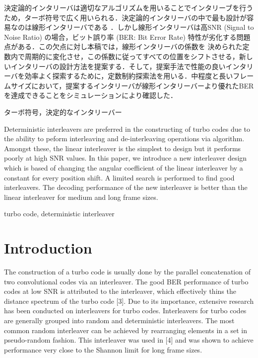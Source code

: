 \documentclass[technicalreport]{ieicej}
\begin{document}
\begin{jabstract}
決定論的インタリーバは適切なアルゴリズムを用いることでインタリーブを行うため，ターボ符号で広く用いられる．決定論的インタリーバの中で最も設計が容易なのは線形インタリーバである
．しかし線形インタリーバは高SNR (Signal to Noise Ratio) の場合，ビット誤り率 
(BER: Bit Error Rate) 特性が劣化する問題点がある．この欠点に対し本稿では，線形インタリーバの係数を
決められた定数内で周期的に変化させ，この係数に従ってすべての位置をシフトさせる，新しいインタリーバの設計方法を提案する．そして，提案手法で性能の良いインタリーバを効率よく探索するために，定数制約探索法を用いる．中程度と長いフレームサイズにおいて，提案するインタリーバが線形インタリーバーより優れたBERを達成できることをシミュレーションにより確認した．
\end{jabstract}
\begin{jkeyword}
ターボ符号，決定的なインタリーバー
\end{jkeyword}
\begin{eabstract}
Deterministic interleavers are preferred in the constructing of turbo codes
 due to the ability to peform interleaving
and de-interleaving operations via algorithm. Amongst these, the linear interleaver is 
the simplest to design but it performs poorly at high SNR values. In this paper,
we introduce a new interleaver design which is based of changing the angular
coefficient of the linear interleaver by a constant for every position shift. A
limited search is performed to find good interleavers. The decoding performance
of the new interleaver is better than the linear interleaver for medium and long frame
sizes. 
\end{eabstract}
\begin{ekeyword}
turbo code, deterministic interleaver
\end{ekeyword}
\maketitle

\section{Introduction}
The construction of a turbo code is usually done by the parallel concatenation of two
convolutional codes via an interleaver. The good BER performance of turbo codes at
low SNR  is attributed to the interleaver, which effectively thins the distance spectrum
of the turbo code [3]. Due to its importance, extensive research has
been conducted on interleavers for turbo codes. Interleavers for turbo codes are 
generally grouped into random and deterministic interleavers. The most common 
random interleaver can be achieved by rearranging elements in a set in
pseudo-random fashion. This interleaver was used in [4] and 
was shown to achieve performance very close to the Shannon limit for long frame 
sizes. 
\end{document}
